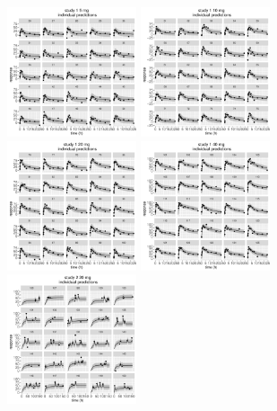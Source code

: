 \documentclass[11pt]{amsart}
\begin{document}
\begin{figure}[htbp]
\includegraphics[width=1.5in,trim=0in 0in 0 0in]{graphics/effCptModelTorsten_0.82/effCptPlots023.pdf}
\includegraphics[width=1.5in,trim=0in 0in 0 0in]{graphics/effCptModelTorsten_0.82/effCptPlots024.pdf}
\includegraphics[width=1.5in,trim=0in 0in 0 0in]{graphics/effCptModelTorsten_0.82/effCptPlots025.pdf}
\includegraphics[width=1.5in,trim=0in 0in 0 0in]{graphics/effCptModelTorsten_0.82/effCptPlots026.pdf}
\includegraphics[width=1.5in,trim=0in 0in 0 0in]{graphics/effCptModelTorsten_0.82/effCptPlots027.pdf}

\end{figure}
\end{document}
